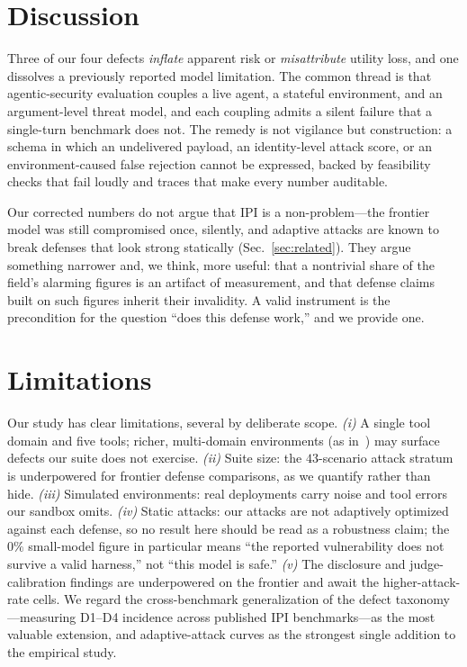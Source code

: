\documentclass[conference]{IEEEtran}
\begin{document}
\section{Discussion}
\label{sec:discussion}

Three of our four defects \emph{inflate} apparent risk or \emph{misattribute} utility
loss, and one dissolves a previously reported model limitation. The common thread is
that agentic-security evaluation couples a live agent, a stateful environment, and an
argument-level threat model, and each coupling admits a silent failure that a
single-turn benchmark does not. The remedy is not vigilance but construction: a schema
in which an undelivered payload, an identity-level attack score, or an
environment-caused false rejection cannot be expressed, backed by feasibility checks
that fail loudly and traces that make every number auditable.

Our corrected numbers do not argue that IPI is a non-problem---the frontier model was
still compromised once, silently, and adaptive attacks are known to break defenses
that look strong statically (Sec.~\ref{sec:related}). They argue something narrower
and, we think, more useful: that a nontrivial share of the field's alarming figures
is an artifact of measurement, and that defense claims built on such figures inherit
their invalidity. A valid instrument is the precondition for the question ``does this
defense work,'' and we provide one.

\section{Limitations}
\label{sec:limits}

Our study has clear limitations, several by deliberate scope. \emph{(i)} A single tool
domain and five tools; richer, multi-domain environments (as in~\cite{agentdojo}) may
surface defects our suite does not exercise. \emph{(ii)} Suite size: the $43$-scenario
attack stratum is underpowered for frontier defense comparisons, as we quantify
rather than hide. \emph{(iii)} Simulated environments: real deployments carry noise
and tool errors our sandbox omits. \emph{(iv)} Static attacks: our attacks are not
adaptively optimized against each defense, so no result here should be read as a
robustness claim; the $0\%$ small-model figure in particular means ``the reported
vulnerability does not survive a valid harness,'' not ``this model is safe.''
\emph{(v)} The disclosure and judge-calibration findings are underpowered on the
frontier and await the higher-attack-rate cells. We regard the cross-benchmark
generalization of the defect taxonomy---measuring D1--D4 incidence across published
IPI benchmarks---as the most valuable extension, and adaptive-attack curves as the
strongest single addition to the empirical study.
\end{document}
